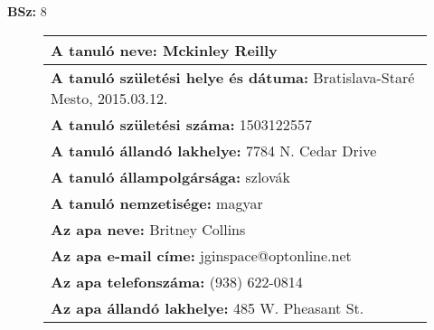 \documentclass[10pt,a4paper]{article}
\begin{document}
    \vfill
    \textbf{BSz: }8
\newpage
    \begin{figure}[!ht]
    \begin{tabular}{|m{\textwidth}|}
    \hline \vspace{3pt}
    \textbf{A tanuló neve:} \hspace{0.5cm} Mckinley Reilly \vspace{3pt} \\
\hline\vspace{3pt}
\textbf{A tanuló születési helye és dátuma:} \hspace{0.5cm} Bratislava-Staré Mesto, 2015.03.12. \vspace{3pt} \\
\hline\vspace{3pt}
\textbf{A tanuló születési száma:} \hspace{0.5cm} 1503122557 \vspace{3pt} \\
\hline\vspace{3pt}
\textbf{A tanuló állandó lakhelye:} \hspace{0.5cm} 7784 N. Cedar Drive \vspace{3pt} \\
\hline\vspace{3pt}
\textbf{A tanuló állampolgársága:} \hspace{0.5cm} szlovák \vspace{3pt} \\
\hline\vspace{3pt}
\textbf{A tanuló nemzetisége:} \hspace{0.5cm} magyar \vspace{3pt} \\
\hline\vspace{3pt}
\textbf{Az apa neve:} \hspace{0.5cm} Britney Collins \vspace{3pt} \\
\hline\vspace{3pt}
\textbf{Az apa e-mail címe:} \hspace{0.5cm} jginspace@optonline.net \vspace{3pt} \\
\hline\vspace{3pt}
\textbf{Az apa telefonszáma:} \hspace{0.5cm} (938) 622-0814 \vspace{3pt} \\
\hline\vspace{3pt}
\textbf{Az apa állandó lakhelye:} \hspace{0.5cm} 485 W. Pheasant St. \vspace{3pt} \\

\end{tabular}
\end{figure}
\end{document}
